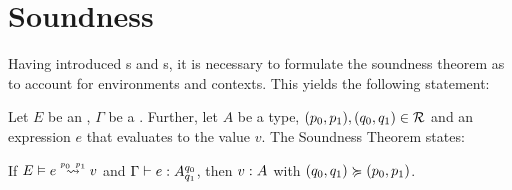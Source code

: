 \section{Soundness}

Having introduced s and s, it is necessary to formulate the soundness theorem as to account for environments and contexts. This yields the following statement:

\begin{theorem}\label{thm:soundness-5}
   Let \(E\) be an , \(\Gamma\) be a . Further, let \(A\) be a type, \((p_0, p_1), (q_0, q_1) \in \mathcal{R}\) and an expression \(e\) that evaluates to the value \(v\). The Soundness Theorem states:

   \begin{center}
   If \(\evals{E}{e}{v}{p_0}{p_1}\) and \(\Gamma \vdash e : A ^{q_0}_{q_1}\), then \(v : A ^{}_{}\) with \((q_0, q_1) \succcurlyeq (p_0, p_1)\).
   \end{center}
\end{theorem}

